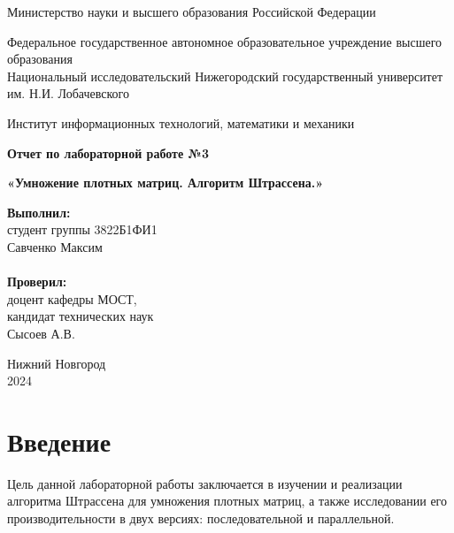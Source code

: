 \documentclass[a4paper, 14pt]{extarticle}
\begin{document}
    \begin{titlepage}

\begin{center}
Министерство науки и высшего образования Российской Федерации
\end{center}

\begin{center}
Федеральное государственное автономное образовательное учреждение высшего образования \\
Национальный исследовательский Нижегородский государственный университет им. Н.И. Лобачевского
\end{center}

\begin{center}
Институт информационных технологий, математики и механики
\end{center}

\vspace{4em}

\begin{center}
\textbf{\Large Отчет по лабораторной работе №3} \\
\end{center}
\begin{center}
\textbf{\Large «Умножение плотных матриц. Алгоритм Штрассена.»} \\
\end{center}

\vspace{4em}

\hfill\parbox{7cm}{
\textbf{Выполнил:} \\ 
студент группы 3822Б1ФИ1 \\ 
Савченко Максим\\
\\
\textbf{Проверил:}\\ 
доцент кафедры МОСТ, \\ 
кандидат технических наук \\ 
Сысоев А.В.\\}

\vspace{\fill}

\begin{center} Нижний Новгород \\ 2024 \end{center}

\end{titlepage}

    \tableofcontents

    \newpage
    \section{Введение}
Цель данной лабораторной работы заключается в изучении и реализации алгоритма Штрассена для умножения плотных матриц, а также исследовании его производительности в двух версиях: последовательной и параллельной. 
\end{document}
